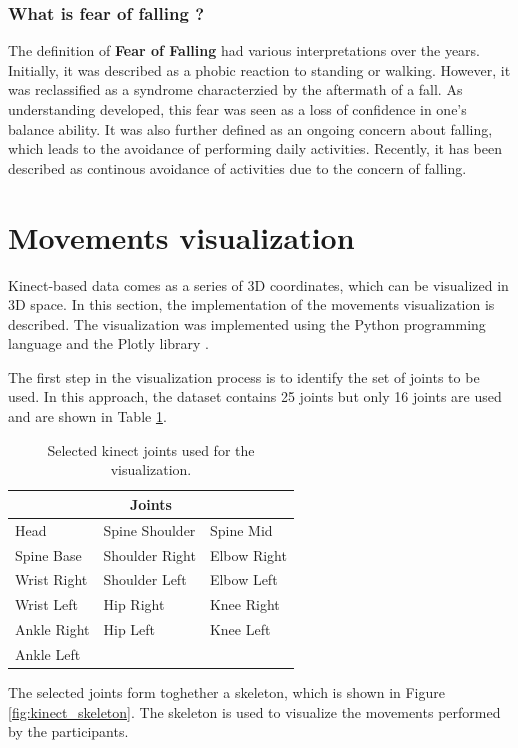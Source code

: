         \subsubsection{What is fear of falling ?}
        
            The definition of \textbf{Fear of Falling} had various interpretations over the years. Initially, it was described as a phobic reaction to standing or walking. However, it was reclassified as a syndrome characterzied by the aftermath of a fall. As understanding developed, this fear was seen as a loss of confidence in one's balance ability. It was also further defined as an ongoing concern about falling, which leads to the avoidance of performing daily activities. Recently, it has been described as continous avoidance of activities due to the concern of falling. \cite{jung_fear_2008}
    
    \section{Movements visualization} \label{sec:movements_visualization}
        Kinect-based data comes as a series of 3D coordinates, which can be visualized in 3D space. In this section, the implementation of the movements visualization is described. The visualization was implemented using the Python programming language and the Plotly library \cite{plotly}.

        The first step in the visualization process is to identify the set of joints to be used. In this approach, the dataset contains 25 joints but only 16 joints are used and are shown in Table \ref{tab:joints_selected}. 

        \begin{table}[h]
            \centering
            \caption{Selected kinect joints used for the visualization.}
            \label{tab:joints_selected}
            \begin{tabularx}{0.8\textwidth}{XXX}
                \toprule
                \multicolumn{3}{c}{\textbf{Joints}} \\
                \midrule
                Head & Spine Shoulder & Spine Mid \\
                Spine Base & Shoulder Right & Elbow Right \\
                Wrist Right & Shoulder Left & Elbow Left \\
                Wrist Left & Hip Right & Knee Right \\
                Ankle Right & Hip Left & Knee Left \\
                Ankle Left & & \\
                \bottomrule
            \end{tabularx}
        \end{table}
        The selected joints form toghether a skeleton, which is shown in Figure \ref{fig:kinect_skeleton}. The skeleton is used to visualize the movements performed by the participants. \\

